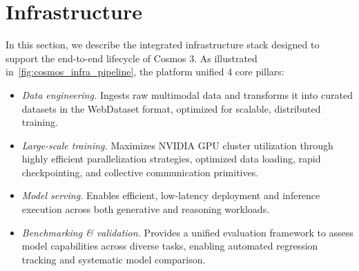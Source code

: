\section{Infrastructure}
\label{sec::infrastructure}

In this section, we describe the integrated infrastructure stack designed to support the end-to-end lifecycle of Cosmos 3. As illustrated in~\cref{fig:cosmos_infra_pipeline}, the platform unified 4 core pillars:
\begin{itemize}
    \item \textit{Data engineering.} Ingests raw multimodal data and transforms it into curated datasets in the WebDataset format, optimized for scalable, distributed training.
    \item \textit{Large-scale training.} Maximizes NVIDIA GPU cluster utilization through highly efficient parallelization strategies, optimized data loading, rapid checkpointing, and collective communication primitives.
    \item \textit{Model serving.} Enables efficient, low-latency deployment and inference execution across both generative and reasoning workloads.
    \item \textit{Benchmarking \& validation.} Provides a unified evaluation framework to assess model capabilities across diverse tasks, enabling automated regression tracking and systematic model comparison.
\end{itemize}






